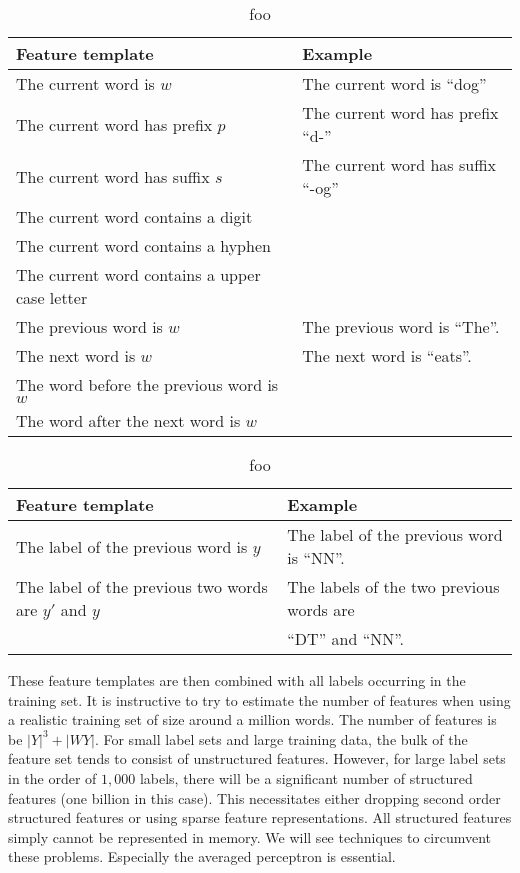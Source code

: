 \begin{table}[!htb]
\begin{tabular}{ll}  
Feature template & Example\\
\hline
The current word is $w$ & The current word is ``dog''\\
The current word has prefix $p$ & The current word has prefix ``d-''\\
The current word has suffix $s$ & The current word has suffix ``-og''\\
The current word contains a digit & \\
The current word contains a hyphen & \\
The current word contains a upper case letter & \\
The previous word is $w$ & The previous word is ``The''. \\
The next word is $w$ & The next word is ``eats''. \\
The word before the previous word is $w$ & \\
The word after the next word is $w$ & \\
\end{tabular}
\caption{foo}\label{tab:uratna}
\end{table}

\begin{table}[!htb]
\begin{tabular}{ll}
Feature template & Example\\
\hline
The label of the previous word is $y$ & The label of the previous word is ``NN''. \\
The label of the previous two words are $y'$ and $y$ & The labels of the two previous words are\\
 & ``DT'' and ``NN''. 
\end{tabular}
\caption{foo}\label{tab:sratna}
\end{table}

These feature templates are then combined with all labels occurring in
the training set. It is instructive to try to estimate the number of
features when using a realistic training set of size around a million
words. The number of features is be $|Y|^3 + |WY|$. For small
label sets and large training data, the bulk of the feature set tends
to consist of unstructured features. However, for large label sets in
the order of $1,000$ labels, there will be a significant number of
structured features (one billion in this case). This necessitates
either dropping second order structured features or using sparse
feature representations. All structured features simply cannot be
represented in memory. We will see techniques to circumvent these
problems. Especially the averaged perceptron is essential.

